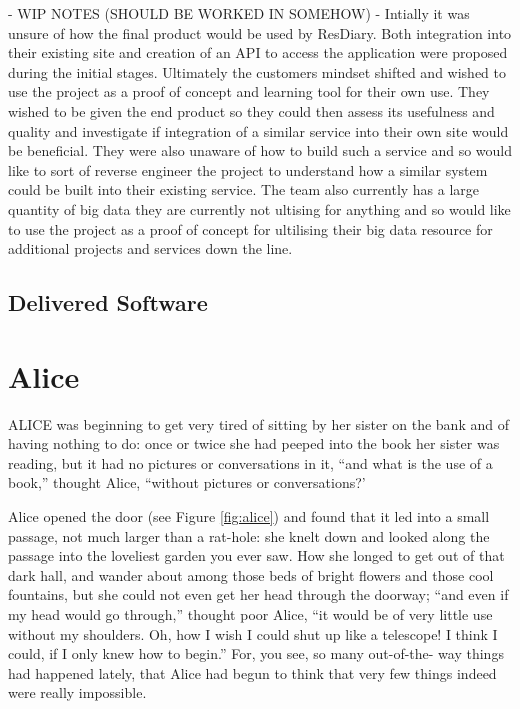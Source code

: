 \documentclass{l3proj}
\begin{document}
- WIP NOTES (SHOULD BE WORKED IN SOMEHOW) -
Intially it was unsure of how the final product would be used by ResDiary. 
Both integration into their existing site and creation of an API to access the application were proposed during the initial stages. 
Ultimately the customers mindset shifted and wished to use the project as a proof of concept and learning tool for their own use.
They wished to be given the end product so they could then assess its usefulness and quality and investigate if integration of a similar service into their own site would be beneficial.
They were also unaware of how to build such a service and so would like to sort of reverse engineer the project to understand how a similar system could be built into their existing service.
The team also currently has a large quantity of big data they are currently not ultising for anything and so would like to use the project as a proof of concept for ultilising their big data resource for additional projects and services down the line.

\subsection{Delivered Software}
\label{finsoftware}

\newpage

\section{Alice}
\label{sec:alice}

ALICE \cite{alice} was beginning to get very tired of sitting by her sister
on the bank and of having nothing to do: once or twice she had peeped into
the book her sister was reading, but it had no pictures or conversations in
it, ``and what is the use of a book,'' thought Alice, ``without pictures or
conversations?'



Alice opened the door (see Figure \ref{fig:alice}) and found that it
led into a small passage, not much larger than a rat-hole: she knelt
down and looked along the passage into the loveliest garden you ever
saw. How she longed to get out of that dark hall, and wander about
among those beds of bright flowers and those cool fountains, but she
could not even get her head through the doorway; ``and even if my head
would go through,'' thought poor Alice, ``it would be of very little
use without my shoulders. Oh, how I wish I could shut up like a
telescope! I think I could, if I only knew how to begin.'' For, you
see, so many out-of-the- way things had happened lately, that Alice
had begun to think that very few things indeed were really impossible.
\end{document}

